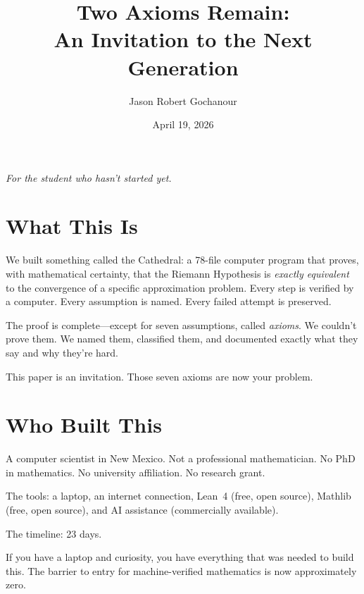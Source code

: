 \documentclass[11pt,a4paper]{article}
\title{%
  Two Axioms Remain:\\
  An Invitation to the Next Generation%
}
\author{
  Jason Robert Gochanour
}
\date{April 19, 2026}
\begin{document}
\maketitle

\begin{center}
\emph{For the student who hasn't started yet.}
\end{center}

\vspace{1cm}

\section*{What This Is}

We built something called the Cathedral: a 78-file computer program
that proves, with mathematical certainty, that the Riemann Hypothesis
is \emph{exactly equivalent} to the convergence of a specific
approximation problem. Every step is verified by a computer. Every
assumption is named. Every failed attempt is preserved.

The proof is complete---except for seven assumptions, called
\emph{axioms}. We couldn't prove them. We named them, classified
them, and documented exactly what they say and why they're hard.

This paper is an invitation. Those seven axioms are now your problem.

\section*{Who Built This}

A computer scientist in New Mexico. Not a professional mathematician.
No PhD in mathematics. No university affiliation. No research grant.

The tools: a laptop, an internet connection, Lean~4 (free, open
source), Mathlib (free, open source), and AI assistance (commercially
available).

The timeline: 23 days.

If you have a laptop and curiosity, you have everything that was
needed to build this. The barrier to entry for machine-verified
mathematics is now approximately zero.

\end{document}
